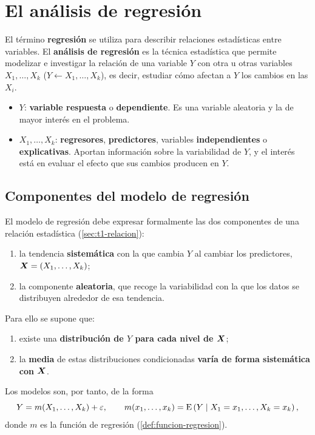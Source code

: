 \section{El análisis de regresión}
\label{sec:t2-analisis}

El término \textbf{regresión} se utiliza para describir relaciones estadísticas entre
variables. El \textbf{análisis de regresión} es la técnica estadística que permite modelizar e
investigar la relación de una variable $Y$ con otra u otras variables $X_1,\ldots,X_k$
($Y \leftarrow X_1,\ldots,X_k$), es decir, estudiar cómo afectan a $Y$ los cambios en las $X_i$.
\begin{itemize}
  \item $Y$: \textbf{variable respuesta} o \textbf{dependiente}. Es una variable aleatoria y la
    de mayor interés en el problema.
  \item $X_1,\ldots,X_k$: \textbf{regresores}, \textbf{predictores}, variables
    \textbf{independientes} o \textbf{explicativas}. Aportan información sobre la variabilidad
    de $Y$, y el interés está en evaluar el efecto que sus cambios producen en $Y$.
\end{itemize}

\subsection{Componentes del modelo de regresión}

El modelo de regresión debe expresar formalmente las dos componentes de una relación
estadística (\cref{sec:t1-relacion}):
\begin{enumerate}
  \item la tendencia \textbf{sistemática} con la que cambia $Y$ al cambiar los predictores,
    $\bm{X}=(X_1,\ldots,X_k)$;
  \item la componente \textbf{aleatoria}, que recoge la variabilidad con la que los datos se
    distribuyen alrededor de esa tendencia.
\end{enumerate}
Para ello se supone que:
\begin{enumerate}
  \item existe una \textbf{distribución de $Y$ para cada nivel de $\bm{X}$};
  \item la \textbf{media} de estas distribuciones condicionadas \textbf{varía de forma
    sistemática con $\bm{X}$}.
\end{enumerate}
Los modelos son, por tanto, de la forma
\[
  Y = m(X_1,\ldots,X_k) + \varepsilon,
  \qquad
  m(x_1,\ldots,x_k) = \operatorname{E}\left(Y \mid X_1=x_1,\ldots,X_k=x_k\right),
\]
donde $m$ es la función de regresión (\cref{def:funcion-regresion}).

